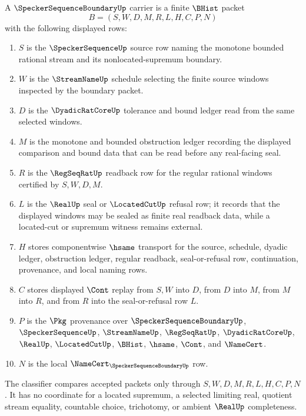 \begin{definition}\label{def:specker-sequence-boundary-carrier}
A $\SpeckerSequenceBoundaryUp$ carrier is a finite $\BHist$ packet
$$
B=(S,W,D,M,R,L,H,C,P,N)
$$
with the following displayed rows:
\begin{enumerate}
\item $S$ is the $\SpeckerSequenceUp$ source row naming the monotone bounded rational stream and its nonlocated-supremum boundary.
\item $W$ is the $\StreamNameUp$ schedule selecting the finite source windows inspected by the boundary packet.
\item $D$ is the $\DyadicRatCoreUp$ tolerance and bound ledger read from the same selected windows.
\item $M$ is the monotone and bounded obstruction ledger recording the displayed comparison and bound data that can be read before any real-facing seal.
\item $R$ is the $\RegSeqRatUp$ readback row for the regular rational windows certified by $S,W,D,M$.
\item $L$ is the $\RealUp$ seal or $\LocatedCutUp$ refusal row; it records that the displayed windows may be sealed as finite real readback data, while a located-cut or supremum witness remains external.
\item $H$ stores componentwise $\hsame$ transport for the source, schedule, dyadic ledger, obstruction ledger, regular readback, seal-or-refusal row, continuation, provenance, and local naming rows.
\item $C$ stores displayed $\Cont$ replay from $S,W$ into $D$, from $D$ into $M$, from $M$ into $R$, and from $R$ into the seal-or-refusal row $L$.
\item $P$ is the $\Pkg$ provenance over $\SpeckerSequenceBoundaryUp$, $\SpeckerSequenceUp$, $\StreamNameUp$, $\RegSeqRatUp$, $\DyadicRatCoreUp$, $\RealUp$, $\LocatedCutUp$, $\BHist$, $\hsame$, $\Cont$, and $\NameCert$.
\item $N$ is the local $\NameCert_{\SpeckerSequenceBoundaryUp}$ row.
\end{enumerate}
The classifier compares accepted packets only through $S,W,D,M,R,L,H,C,P,N$. It has no coordinate for a located supremum, a selected limiting real, quotient stream equality, countable choice, trichotomy, or ambient $\RealUp$ completeness.
\end{definition}

